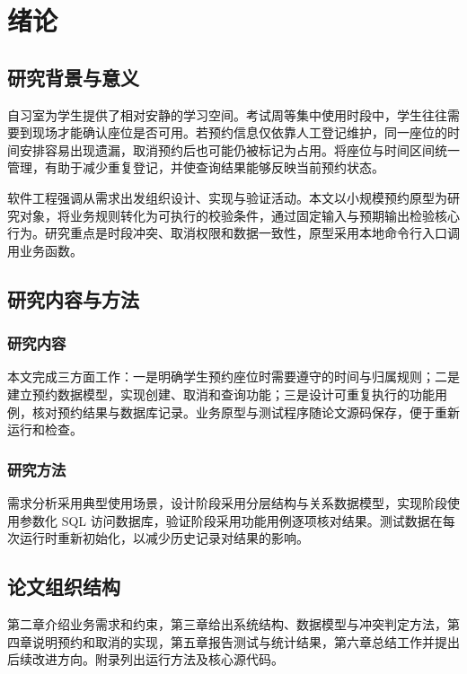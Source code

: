 \chapter{绪论}
\section{研究背景与意义}
自习室为学生提供了相对安静的学习空间。考试周等集中使用时段中，学生往往需要到现场才能确认座位是否可用。若预约信息仅依靠人工登记维护，同一座位的时间安排容易出现遗漏，取消预约后也可能仍被标记为占用。将座位与时间区间统一管理，有助于减少重复登记，并使查询结果能够反映当前预约状态。

软件工程强调从需求出发组织设计、实现与验证活动\cite{sommerville2016}。本文以小规模预约原型为研究对象，将业务规则转化为可执行的校验条件，通过固定输入与预期输出检验核心行为。研究重点是时段冲突、取消权限和数据一致性，原型采用本地命令行入口调用业务函数。

\section{研究内容与方法}
\subsection{研究内容}
本文完成三方面工作：一是明确学生预约座位时需要遵守的时间与归属规则；二是建立预约数据模型，实现创建、取消和查询功能；三是设计可重复执行的功能用例，核对预约结果与数据库记录。业务原型与测试程序随论文源码保存，便于重新运行和检查。

\subsection{研究方法}
需求分析采用典型使用场景，设计阶段采用分层结构与关系数据模型，实现阶段使用参数化 SQL 访问数据库，验证阶段采用功能用例逐项核对结果。测试数据在每次运行时重新初始化，以减少历史记录对结果的影响。

\section{论文组织结构}
第二章介绍业务需求和约束，第三章给出系统结构、数据模型与冲突判定方法，第四章说明预约和取消的实现，第五章报告测试与统计结果，第六章总结工作并提出后续改进方向。附录列出运行方法及核心源代码。
